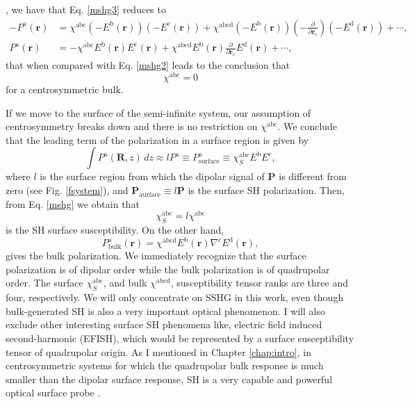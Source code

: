\cite{jacksonbook}, we have that Eq. \eqref{mshg3} reduces to
\begin{align}\label{mshg4}
-P^{\mathrm{a}}(\mathbf{r})
&= \chi^{\mathrm{abc}}(-E^{\mathrm{b}}(\mathbf{r}))(-E^{\mathrm{c}}(\mathbf{r}))
 + \chi^{\mathrm{abcd}}(-E^{\mathrm{b}}(\mathbf{r}))
(-\frac{\partial}{\partial\mathbf{r}_{\mathrm{c}}})(-E^{\mathrm{d}}(\mathbf{r})) 
 + \cdots,\nonumber\\
P^{\mathrm{a}}(\mathbf{r})
&= -\chi^{\mathrm{abc}}E^{\mathrm{b}}(\mathbf{r})E^{\mathrm{c}}(\mathbf{r})
 + \chi^{\mathrm{abcd}}E^{\mathrm{b}}(\mathbf{r})
   \frac{\partial}{\partial\mathbf{r}_{\mathrm{c}}}E^{\mathrm{d}}(\mathbf{r}) 
 + \cdots,
\end{align}
that when compared with Eq. \eqref{mshg2} leads to the conclusion that
\begin{equation}\label{sshg}
\chi^{\mathrm{abc}} = 0
\end{equation}
for a centrosymmetric bulk.

If we move to the surface of the semi-infinite system, our assumption of
centrosymmetry breaks down and there is no restriction on $\chi^{\mathrm{abc}}$.
We conclude that the leading term of the polarization in a surface region is
given by
\begin{equation}\label{sshgp1}
\int P^{\mathrm{a}}(\mathbf{R},z)\,dz \approx lP^{\mathrm{a}}
\equiv P^{\mathrm{a}}_{\mathrm{surface}}
\equiv \chi^{\mathrm{abc}}_{S}E^{\mathrm{b}}E^{\mathrm{c}},
\end{equation}
where $l$ is the surface region from which the dipolar signal of $\mathbf{P}$ is
different from zero (see Fig. \ref{fsystem}), and
$\mathbf{P}_{\mathrm{aurface}}\equiv l\mathbf{P}$ is the surface SH
polarization. Then, from Eq. \eqref{mshg} we obtain that
\begin{equation}\label{sshgp2}
\chi^{\mathrm{abc}}_{S} = l\chi^{\mathrm{abc}}
\end{equation}
is the SH surface susceptibility. On the other hand,
\begin{equation}\label{sshgp3}
P^{\mathrm{a}}_{\mathrm{bulk}}(\mathbf{r})
= \chi^{\mathrm{abcd}}
  E^{\mathrm{b}}(\mathbf{r})\nabla^{\mathrm{c}}E^{\mathrm{d}}(\mathbf{r}),  
\end{equation}
gives the bulk polarization. We immediately recognize that the surface
polarization is of dipolar order while the bulk polarization is of quadrupolar
order. The surface $\chi^{\mathrm{abc}}_{S}$, and bulk $\chi^{\mathrm{abcd}}$,
susceptibility tensor ranks are three and four, respectively. We will only
concentrate on SSHG in this work, even though bulk-generated SH is also a very
important optical phenomenon. I will also exclude other interesting surface SH
phenomena like, electric field induced second-harmonic (EFISH), which would be
represented by a surface susceptibility tensor of quadrupolar origin. As I
mentioned in Chapter \ref{chap:intro}, in centrosymmetric systems for which the
quadrupolar bulk response is much smaller than the dipolar surface response, SH
is a very capable and powerful optical surface probe \cite{downerSIA01}.

